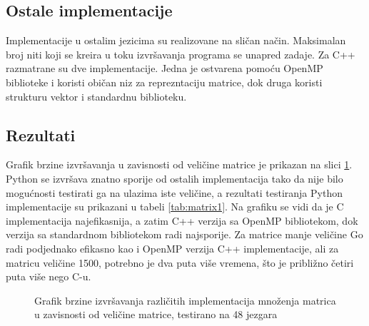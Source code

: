 \documentclass[12pt,oneside]{memoir}
\begin{document}
\subsection{Ostale implementacije}
Implementacije u ostalim jezicima su realizovane na sličan način. Maksimalan broj niti koji se kreira u toku izvršavanja programa se unapred zadaje. Za C++ razmatrane su dve implementacije. Jedna je ostvarena pomoću OpenMP biblioteke i koristi običan niz za reprezntaciju matrice, dok druga koristi strukturu vektor i standardnu biblioteku.


\subsection{Rezultati}

Grafik brzine izvršavanja u zavisnosti od veličine matrice je prikazan na slici \ref{fig:matrix1}. Python se izvršava znatno sporije od ostalih implementacija tako da nije bilo mogućnosti testirati ga na ulazima iste veličine, a rezultati testiranja Python implementacije su prikazani u tabeli \ref{tab:matrix1}. Na grafiku se vidi da je C implementacija najefikasnija, a zatim C++ verzija sa OpenMP bibliotekom, dok verzija sa standardnom bibliotekom radi najsporije. Za matrice manje veličine Go radi podjednako efikasno kao i OpenMP verzija C++ implementacije, ali za matricu veličine 1500, potrebno je dva puta više vremena, što je približno četiri puta više nego C-u. 
\newpage

\begin{figure}
\begin{center}


\caption{Grafik brzine izvršavanja različitih implementacija množenja matrica u zavisnosti od veličine matrice, testirano na 48 jezgara}
\label{fig:matrix1}
\end{center}
\end{figure}
\end{document}

